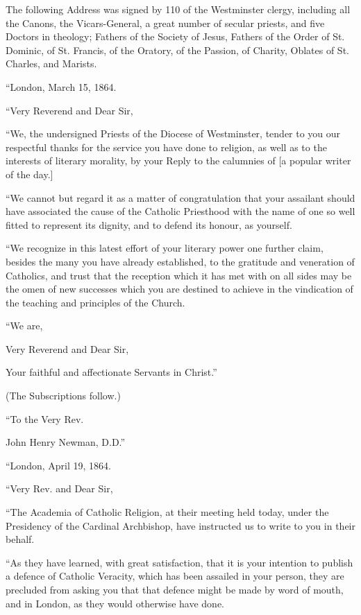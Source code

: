 
The following Address was signed by 110 of the Westminster clergy,
including all the Canons, the Vicars-General, a great number of secular
priests, and five Doctors in theology; Fathers of the Society of Jesus,
Fathers of the Order of St. Dominic, of St. Francis, of the Oratory, of
the Passion, of Charity, Oblates of St. Charles, and Marists.

``London, March 15, 1864.

``Very Reverend and Dear Sir,

``We, the undersigned Priests of the Diocese of Westminster, tender
to you our respectful thanks for the service you have done to religion,
as well as to the interests of literary morality, by your Reply to the
calumnies of [a popular writer of the day.]

``We cannot but regard it as a matter of congratulation that your
assailant should have associated the cause of the Catholic Priesthood
with the name of one so well fitted to represent its dignity, and to
defend its honour, as yourself.

``We recognize in this latest effort of your literary power one
further claim, besides the many you have already established, to the
gratitude and veneration of Catholics, and trust that the reception
which it has met with on all sides may be the omen of new successes
which you are destined to achieve in the vindication of the teaching and
principles of the Church.

``We are,

Very Reverend and Dear Sir,

Your faithful and affectionate Servants in Christ.''

(The Subscriptions follow.)

``To the Very Rev.

John Henry Newman, D.D.''


``London, April 19, 1864.

``Very Rev. and Dear Sir,

``The Academia of Catholic Religion, at their meeting held today,
under the Presidency of the Cardinal Archbishop, have instructed us to
write to you in their behalf.

``As they have learned, with great satisfaction, that it is your
intention to publish a defence of Catholic Veracity, which has been
assailed in your person, they are precluded from asking you that that
defence might be made by word of mouth, and in London, as they would
otherwise have done.

